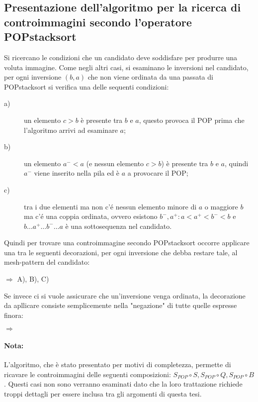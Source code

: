 \subsection{Presentazione  dell'algoritmo per la ricerca di controimmagini secondo l'operatore POPstacksort} 
Si ricercano le condizioni che un candidato deve soddisfare per produrre una voluta immagine. Come negli altri casi, si esaminano le inversioni nel candidato, per ogni inversione $(b,a)$ che non viene ordinata da una passata di POPstacksort si verifica una delle sequenti condizioni:
\begin{description}
	\item[a)] un elemento $c>b$ \`e presente tra $b$ e $a$, questo provoca il POP prima che l'algoritmo arrivi ad esaminare $a$;
	\item[b)] un elemento $a^-<a$ (e nessun elemento $c>b$) \`e presente tra $b$ e $a$, quindi $a^-$ viene inserito nella pila ed \`e $a$ a provocare il POP;
	\item[c)] tra i due elementi ma non c'\'e nessun elemento minore di $a$ o maggiore $b$ ma c'\'e una coppia ordinata, ovvero esistono ${b^-,a^+}:a<a^+<b^-<b$ e $b\dots{a^+}\dots{b^-}\dots{a}$ \`e una sottosequenza nel candidato.
\end{description}
Quindi per trovare una controimmagine secondo POPstacksort occorre applicare una tra le seguenti decorazioni, per ogni inversione che debba restare tale, al mesh-pattern del candidato:
\begin{center}
$\Rightarrow$
A),
B),
C)
\end{center}
Se invece ci si vuole assicurare che un'inversione venga ordinata, la decorazione da apllicare consiste semplicemente nella "negazione" di tutte quelle espresse finora:
\begin{center}
$\Rightarrow$
\end{center}
\paragraph*{Nota:} L'algoritmo, che \`e stato presentato per motivi di completezza, permette di ricavare le controimmagini delle seguenti composizioni: $S_{POP}\circ{S},S_{POP}\circ{Q},S_{POP}\circ{B}$. Questi casi non sono verranno esaminati dato che la loro trattazione richiede troppi dettagli per essere inclusa tra gli argomenti di questa tesi.
